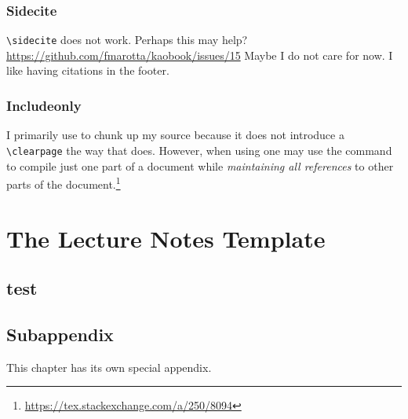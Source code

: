\documentclass[12pt, oneside]{report}    %
\let\oldsection\section
\def\section{%
  \setcounter{sidenote}{1}%
  \oldsection
}
\begin{document}
\subsection{Sidecite}
\verb!\sidecite! does not work. Perhaps this may help?
\url{https://github.com/fmarotta/kaobook/issues/15} Maybe I do not care for now. I like having citations in the footer.


\subsection{Includeonly}

I primarily use \verb!! to chunk up my source because it does not introduce a \verb!\clearpage! the way that \verb!! does. However, when using \verb!! one may use the \verb!! command to compile just one part of a document while \emph{maintaining all references} to other parts of the document.\footnote{\url{https://tex.stackexchange.com/a/250/8094}} 



\chapter{The Lecture Notes Template}


\section{test}
\lipsum[2]






% 
% 
% 
% 
% 

\begin{subappendices}
\section{Subappendix}\label{sec:subappendix:eg}
This chapter has its own special appendix.
\end{subappendices}
\end{document}
